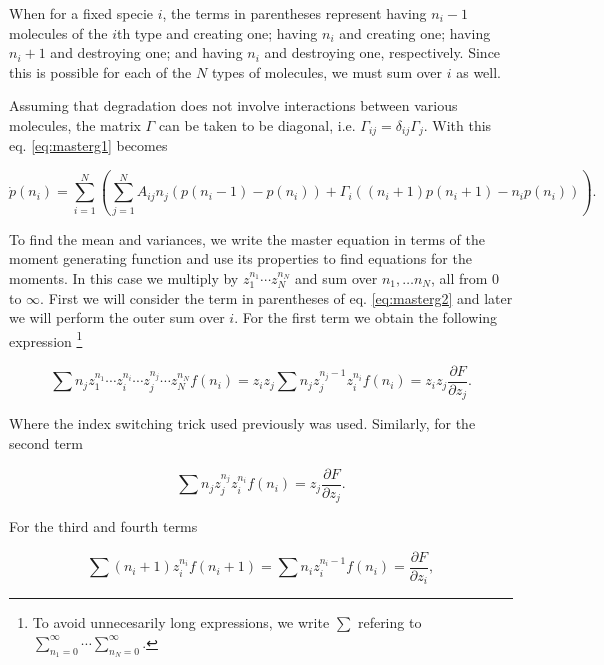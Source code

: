 When for a fixed specie $i$, the terms in parentheses represent having $n_i-1$ molecules of the $i$th type and creating one; having $n_i$ and creating one; having $n_i+1$ and destroying one; and having $n_i$ and destroying one, respectively. Since this is possible for each of the $N$ types of molecules, we must sum over $i$ as well.

Assuming that degradation does not involve interactions between various molecules, the matrix $\Gamma$ can be taken to be diagonal, i.e. $\Gamma_{ij}=\delta_{ij}\Gamma_j$. With this eq. \eqref{eq:masterg1} becomes

\begin{equation}
\label{eq:masterg2}
\dot{p}(n_i) =  \sum_{i=1}^N\left(\sum_{j=1}^N A_{ij}n_j \left( p(n_i-1) - p(n_i) \right) + \Gamma_{i}((n_i+1)p(n_i+1)-n_ip(n_i))\right).
\end{equation}

To find the mean and variances, we write the master equation in terms of the moment generating function and use its properties to find equations for the moments. In this case we multiply by $z_1^{n_1}\dotsm z_N^{n_N}$ and sum over $n_1,\dotsc n_N$, all from $0$ to $\infty$. First we will consider the term in parentheses of eq. \eqref{eq:masterg2} and later we will perform the outer sum over $i$. For the first term we obtain the following expression \footnote{To avoid unnecesarily long expressions, we write $\sum$ refering to $\sum_{n_1=0}^\infty\dotsi\sum_{n_N=0}^\infty$.}

\begin{equation}
  \label{eq:momg1}
  \sum n_j z_1^{n_1}\dotsm z_i^{n_i}\dotsm z_j^{n_j}\dotsm z_N^{n_N} f(n_i) = z_iz_j\sum n_jz_j^{n_j-1}z_i^{n_i}f(n_i) = z_iz_j\frac{\partial F}{\partial z_j}. 
\end{equation} 

Where the index switching trick used previously was used. Similarly, for the second term

\begin{equation}
  \label{eq:momg2}
  \sum n_jz_j^{n_j}z_i^{n_i}f(n_i) = z_j\frac{\partial F}{\partial z_j}.
\end{equation}

For the third and fourth terms

\begin{equation}
  \label{eq:momg3}
  \sum (n_i+1)z_i^{n_i}f(n_i+1) = \sum n_i z_i^{n_i-1}f(n_i) = \frac{\partial F}{\partial z_i},
\end{equation}

